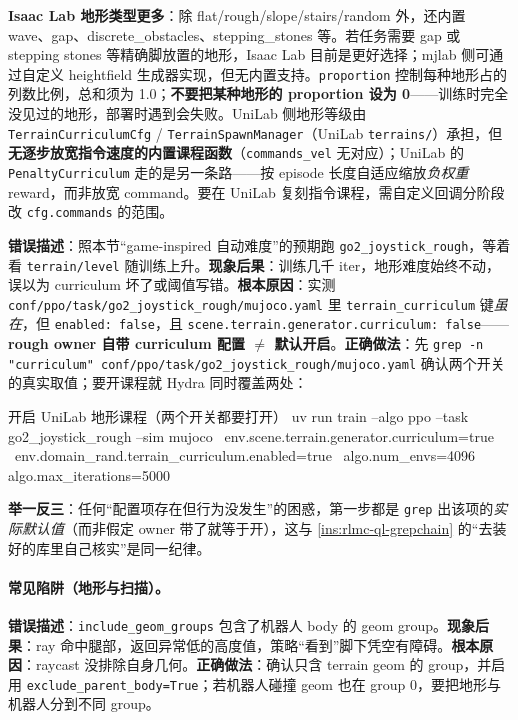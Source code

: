 \textbf{Isaac Lab 地形类型更多}：除 flat/rough/slope/stairs/random 外，还内置 wave、gap、discrete\_obstacles、stepping\_stones 等。若任务需要 gap 或 stepping stones 等精确脚放置的地形，Isaac Lab 目前是更好选择；mjlab 侧可通过自定义 heightfield 生成器实现，但无内置支持。\verb|proportion| 控制每种地形占的列数比例，总和须为 1.0；\textbf{不要把某种地形的 proportion 设为 0}——训练时完全没见过的地形，部署时遇到会失败。UniLab 侧地形等级由 \verb|TerrainCurriculumCfg| / \verb|TerrainSpawnManager|（UniLab \verb|terrains/|）承担，但\textbf{无逐步放宽指令速度的内置课程函数}（\verb|commands_vel| 无对应）；UniLab 的 \verb|PenaltyCurriculum| 走的是另一条路——按 episode 长度自适应缩放\emph{负权重} reward，而非放宽 command。要在 UniLab 复刻指令课程，需自定义回调分阶段改 \verb|cfg.commands| 的范围。

\begin{pitfall}
\textbf{错误描述}：照本节“game-inspired 自动难度”的预期跑 \verb|go2_joystick_rough|，等着看 \verb|terrain/level| 随训练上升。\textbf{现象后果}：训练几千 iter，地形难度始终不动，误以为 curriculum 坏了或阈值写错。\textbf{根本原因}：实测 \verb|conf/ppo/task/go2_joystick_rough/mujoco.yaml| 里 \verb|terrain_curriculum| 键\emph{虽在}，但 \verb|enabled: false|，且 \verb|scene.terrain.generator.curriculum: false|——\textbf{rough owner 自带 curriculum 配置 $\ne$ 默认开启}。\textbf{正确做法}：先 \verb|grep -n "curriculum" conf/ppo/task/go2_joystick_rough/mujoco.yaml| 确认两个开关的真实取值；要开课程就 Hydra 同时覆盖两处：
\begin{codebox}[bash]{开启 UniLab 地形课程（两个开关都要打开）}
uv run train --algo ppo --task go2_joystick_rough --sim mujoco \
  env.scene.terrain.generator.curriculum=true \
  env.domain_rand.terrain_curriculum.enabled=true \
  algo.num_envs=4096 algo.max_iterations=5000
\end{codebox}
\textbf{举一反三}：任何“配置项存在但行为没发生”的困惑，第一步都是 \verb|grep| 出该项的\emph{实际默认值}（而非假定 owner 带了就等于开），这与 \cref{ins:rlmc-ql-grepchain} 的“去装好的库里自己核实”是同一纪律。
\end{pitfall}

\paragraph{常见陷阱（地形与扫描）。}

\begin{pitfall}
\textbf{错误描述}：\verb|include_geom_groups| 包含了机器人 body 的 geom group。\textbf{现象后果}：ray 命中腿部，返回异常低的高度值，策略“看到”脚下凭空有障碍。\textbf{根本原因}：raycast 没排除自身几何。\textbf{正确做法}：确认只含 terrain geom 的 group，并启用 \verb|exclude_parent_body=True|；若机器人碰撞 geom 也在 group 0，要把地形与机器人分到不同 group。
\end{pitfall}

